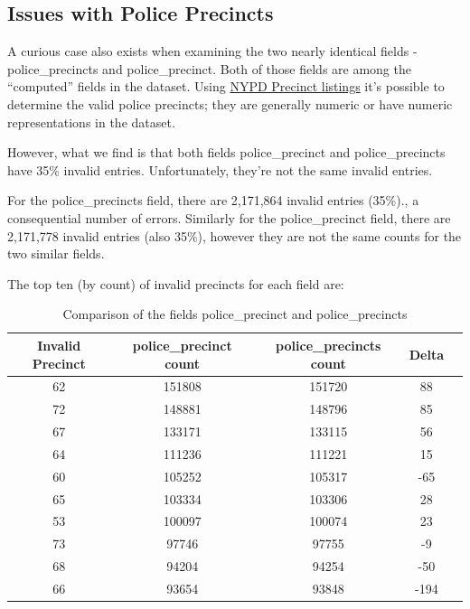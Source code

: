 \documentclass[12pt, titlepage]{article}
\begin{document}
{	
	\subsection{Issues with Police Precincts}
	\label{sec:police-precincts}
	A curious case also exists when examining the two nearly identical 
	fields - police\_precincts and police\_precinct. Both of those fields 
	are among the ``computed'' fields in the dataset. Using 
	\href{https://www.nyc.gov/site/nypd/bureaus/patrol/precincts-landing.page}
	{NYPD Precinct listings} it's possible to determine the valid 
	police precincts; they are generally numeric or have numeric 
	representations in the dataset. 
	
	However, what we find is that both fields police\_precinct 
	and police\_precincts  have  35\% invalid entries. Unfortunately, 
	they're not the same invalid entries. 
	
	For the police\_precincts field, there are 2,171,864 invalid entries 
	(35\%)., a consequential number of errors. Similarly for the 
	police\_precinct field, there are 2,171,778 invalid entries 
	(also 35\%), however they are not the same counts for the two similar fields.

	The top ten (by count) of invalid precincts for each field are:

	\begin{table}[tbp]
	\normalsize
	\centering
	\caption{Comparison of the fields police\_precinct and police\_precincts}
		\begin{tabular}{ccccc}
		\toprule
		\textbf{Invalid Precinct} & \textbf{police\_precinct count} 
		& \textbf{police\_precincts count} & \textbf{Delta}\\
		\midrule
			62 & 151808 & 151720 & 88 \\
			72 & 148881 & 148796 & 85 \\
			67 & 133171 & 133115 & 56 \\
			64 & 111236 & 111221 & 15 \\
			60 & 105252 & 105317 & -65 \\
			65 & 103334 & 103306 & 28 \\
			53 & 100097 & 100074 & 23 \\
			73 & 97746 & 97755 & -9 \\
			68 & 94204 & 94254 & -50 \\
			66 & 93654 & 93848 & -194 \\
	\bottomrule
	\end{tabular}
	\label{tab:comparison-precincts-diff}
	\end{table}
	
}
\end{document}

